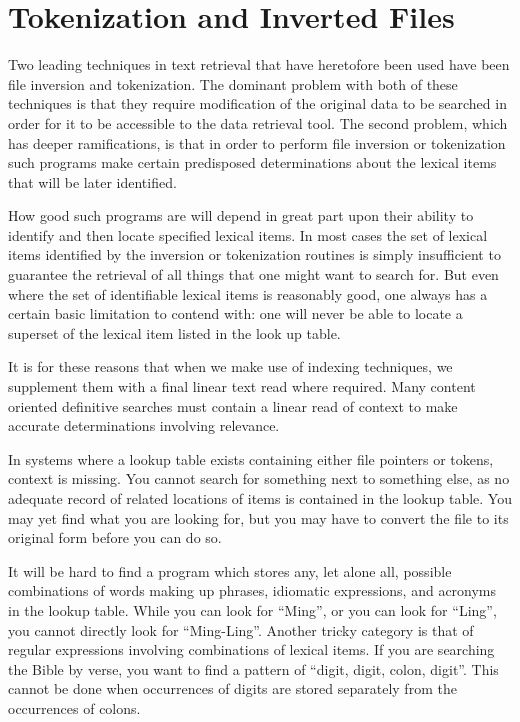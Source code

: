 \section{Tokenization and Inverted Files}

Two leading techniques in text retrieval that have heretofore been
used have been file inversion and tokenization.  The dominant problem
with both of these techniques is that they require modification of the
original data to be searched in order for it to be accessible to the
data retrieval tool.  The second problem, which has deeper
ramifications, is that in order to perform file inversion or
tokenization such programs make certain predisposed determinations
about the lexical items that will be later identified.

How good such programs are will depend in great part upon their
ability to identify and then locate specified lexical items.  In most
cases the set of lexical items identified by the inversion or
tokenization routines is simply insufficient to guarantee the
retrieval of all things that one might want to search for.  But even
where the set of identifiable lexical items is reasonably good, one
always has a certain basic limitation to contend with:  one will never
be able to locate a superset of the lexical item listed in the look up
table.

It is for these reasons that when we make use of indexing techniques,
we supplement them with a final linear text read where required.  Many
content oriented definitive searches must contain a linear read of
context to make accurate determinations involving relevance.

In systems where a lookup table exists containing either file pointers
or tokens, context is missing.  You cannot search for something next
to something else, as no adequate record of related locations of items
is contained in the lookup table.  You may yet find what you are
looking for, but you may have to convert the file to its original form
before you can do so.

It will be hard to find a program which stores any, let alone all,
possible combinations of words making up phrases, idiomatic
expressions, and acronyms in the lookup table.  While you can look for
``Ming'', or you can look for ``Ling'', you cannot directly look for
``Ming-Ling''.  Another tricky category is that of regular expressions
involving combinations of lexical items.  If you are searching the
Bible by verse, you want to find a pattern of ``digit, digit, colon,
digit''.  This cannot be done when occurrences of digits are stored
separately from the occurrences of colons.

